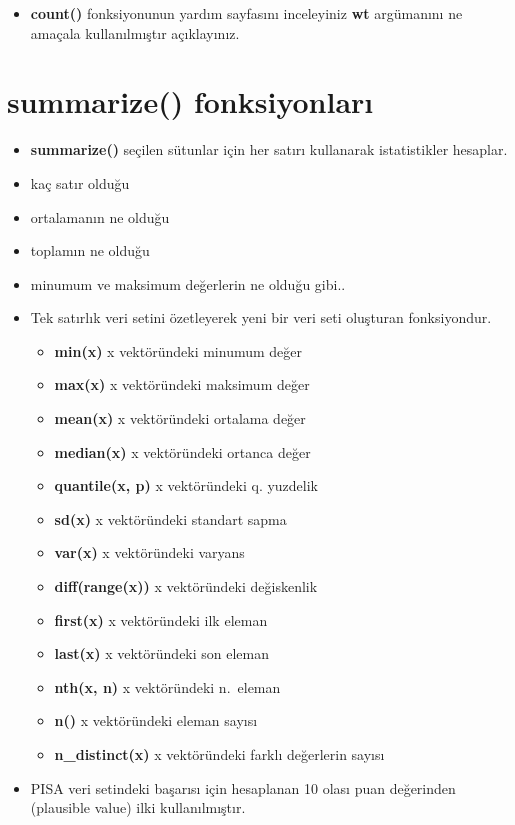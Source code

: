 \documentclass[
  oneside]{book}
\providecommand{\tightlist}{%
  \setlength{\itemsep}{0pt}\setlength{\parskip}{0pt}}
\begin{document}
\begin{itemize}
\tightlist
\item
  \textbf{count()} fonksiyonunun yardım sayfasını inceleyiniz \textbf{wt} argümanını ne amaçala kullanılmıştır açıklayınız.
\end{itemize}

\hypertarget{summarize-fonksiyonlarux131}{%
\section{summarize() fonksiyonları}\label{summarize-fonksiyonlarux131}}

\begin{itemize}
\item
  \textbf{summarize()} seçilen sütunlar için her satırı kullanarak istatistikler hesaplar.
\item
  kaç satır olduğu
\item
  ortalamanın ne olduğu
\item
  toplamın ne olduğu
\item
  minumum ve maksimum değerlerin ne olduğu gibi..
\item
  Tek satırlık veri setini özetleyerek yeni bir veri seti oluşturan fonksiyondur.

  \begin{itemize}
  \tightlist
  \item
    \textbf{min(x)} x vektöründeki minumum değer
  \item
    \textbf{max(x)} x vektöründeki maksimum değer
  \item
    \textbf{mean(x)} x vektöründeki ortalama değer
  \item
    \textbf{median(x)} x vektöründeki ortanca değer
  \item
    \textbf{quantile(x, p)} x vektöründeki q. yuzdelik
  \item
    \textbf{sd(x)} x vektöründeki standart sapma
  \item
    \textbf{var(x)} x vektöründeki varyans
  \item
    \textbf{diff(range(x))} x vektöründeki değiskenlik
  \item
    \textbf{first(x)} x vektöründeki ilk eleman
  \item
    \textbf{last(x)} x vektöründeki son eleman
  \item
    \textbf{nth(x, n)} x vektöründeki n.~eleman
  \item
    \textbf{n()} x vektöründeki eleman sayısı
  \item
    \textbf{n\_distinct(x)} x vektöründeki farklı değerlerin sayısı
  \end{itemize}
\item
  PISA veri setindeki başarısı için hesaplanan 10 olası puan değerinden (plausible value) ilki kullanılmıştır.
\end{itemize}
\end{document}

